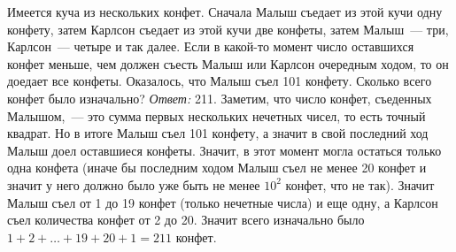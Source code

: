 \problem
Имеется куча из нескольких конфет.
Сначала Малыш съедает из этой кучи одну конфету, затем Карлсон съедает из этой
кучи две конфеты, затем Малыш~--- три, Карлсон~--- четыре и так далее.
Если в какой-то момент число оставшихся конфет меньше, чем должен съесть Малыш
или Карлсон очередным ходом, то он доедает все конфеты.
Оказалось, что Малыш съел 101 конфету.
Сколько всего конфет было изначально?
\solution
\emph{Ответ:} 211.
Заметим, что число конфет, съеденных Малышом,~--- это сумма первых нескольких
нечетных чисел, то есть точный квадрат.
Но в итоге Малыш съел 101 конфету, а значит в свой последний ход Малыш доел
оставшиеся конфеты.
Значит, в этот момент могла остаться только одна конфета
(иначе бы последним ходом Малыш съел не менее 20 конфет и значит у него должно
было уже быть не менее $10^2$ конфет, что не так).
Значит Малыш съел от 1 до 19 конфет (только нечетные числа) и еще одну, а
Карлсон съел количества конфет от 2 до 20.
Значит всего изначально было $1 + 2 + \ldots + 19 + 20 + 1 = 211$ конфет.
\endproblem
